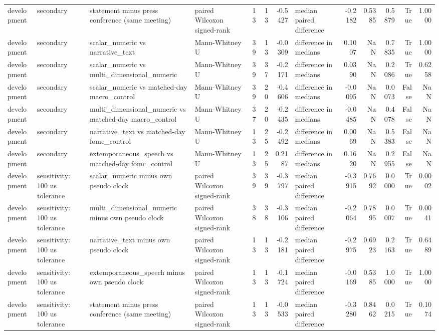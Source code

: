 \begin{tabular}{llllrrrlrrrrr}
development & secondary & statement minus press conference (same meeting) & paired Wilcoxon signed-rank & 13 & 13 & -0.5427 & median paired difference & -0.2182 & 0.5385 & 0.5879 & True & 1.0000 \\
development & secondary & scalar_numeric vs narrative_text & Mann-Whitney U & 39 & 13 & -0.0309 & difference in medians & 0.1007 & NaN & 0.7835 & True & 1.0000 \\
development & secondary & scalar_numeric vs multi_dimensional_numeric & Mann-Whitney U & 39 & 37 & -0.2171 & difference in medians & 0.0390 & NaN & 0.2086 & True & 0.6258 \\
development & secondary & scalar_numeric vs matched-day macro_control & Mann-Whitney U & 39 & 20 & -0.4606 & difference in medians & -0.0095 & NaN & 0.0073 & False & NaN \\
development & secondary & multi_dimensional_numeric vs matched-day macro_control & Mann-Whitney U & 37 & 20 & -0.2435 & difference in medians & -0.0485 & NaN & 0.4078 & False & NaN \\
development & secondary & narrative_text vs matched-day fomc_control & Mann-Whitney U & 13 & 25 & -0.2492 & difference in medians & 0.0069 & NaN & 0.5383 & False & NaN \\
development & secondary & extemporaneous_speech vs matched-day fomc_control & Mann-Whitney U & 13 & 25 & 0.2187 & difference in medians & 0.1620 & NaN & 0.2955 & False & NaN \\
development & sensitivity: 100 us tolerance & scalar_numeric minus own pseudo clock & paired Wilcoxon signed-rank & 39 & 39 & -0.3797 & median paired difference & -0.3915 & 0.7692 & 0.0000 & True & 0.0002 \\
development & sensitivity: 100 us tolerance & multi_dimensional_numeric minus own pseudo clock & paired Wilcoxon signed-rank & 38 & 38 & -0.3106 & median paired difference & -0.2064 & 0.7895 & 0.0007 & True & 0.0041 \\
development & sensitivity: 100 us tolerance & narrative_text minus own pseudo clock & paired Wilcoxon signed-rank & 13 & 13 & -0.2181 & median paired difference & -0.2975 & 0.6923 & 0.2163 & True & 0.6489 \\
development & sensitivity: 100 us tolerance & extemporaneous_speech minus own pseudo clock & paired Wilcoxon signed-rank & 13 & 13 & -0.1724 & median paired difference & -0.0169 & 0.5385 & 1.0000 & True & 1.0000 \\
development & sensitivity: 100 us tolerance & statement minus press conference (same meeting) & paired Wilcoxon signed-rank & 13 & 13 & -0.0533 & median paired difference & -0.3280 & 0.8462 & 0.0215 & True & 0.1074 \\

\end{tabular}
